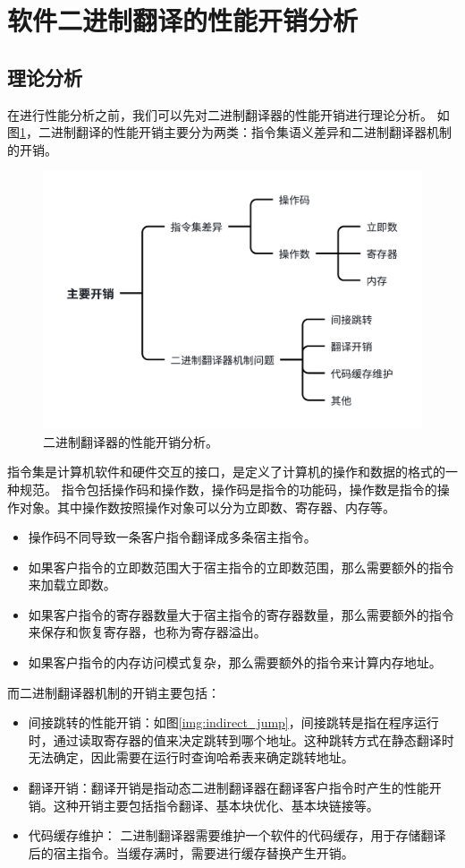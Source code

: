 \section{软件二进制翻译的性能开销分析}\label{sec:bt_overhead_all}

\subsection{理论分析}\label{sec:bt_overhead}

在进行性能分析之前，我们可以先对二进制翻译器的性能开销进行理论分析。
如图\ref{img:bt_overhead}，二进制翻译的性能开销主要分为两类：指令集语义差异和二进制翻译器机制的开销。

\begin{figure}[!htbp]
  \centering
  \includegraphics[width=0.7\linewidth]{./feishuImage/overhead_all.pdf}
  \caption{二进制翻译器的性能开销分析。}
  \label{img:bt_overhead}
\end{figure}

指令集是计算机软件和硬件交互的接口，是定义了计算机的操作和数据的格式的一种规范。
指令包括操作码和操作数，操作码是指令的功能码，操作数是指令的操作对象。其中操作数按照操作对象可以分为立即数、寄存器、内存等。
\begin{itemize}
\item 操作码不同导致一条客户指令翻译成多条宿主指令。
\item 如果客户指令的立即数范围大于宿主指令的立即数范围，那么需要额外的指令来加载立即数。
\item 如果客户指令的寄存器数量大于宿主指令的寄存器数量，那么需要额外的指令来保存和恢复寄存器，也称为寄存器溢出。
\item 如果客户指令的内存访问模式复杂，那么需要额外的指令来计算内存地址。
\end{itemize}

而二进制翻译器机制的开销主要包括：
\begin{itemize}
\item 间接跳转的性能开销：如图\ref{img:indirect_jump}，间接跳转是指在程序运行时，通过读取寄存器的值来决定跳转到哪个地址。这种跳转方式在静态翻译时无法确定，因此需要在运行时查询哈希表来确定跳转地址。
\item 翻译开销：翻译开销是指动态二进制翻译器在翻译客户指令时产生的性能开销。这种开销主要包括指令翻译、基本块优化、基本块链接等。
\item 代码缓存维护： 二进制翻译器需要维护一个软件的代码缓存，用于存储翻译后的宿主指令。当缓存满时，需要进行缓存替换产生开销。
\end{itemize}

